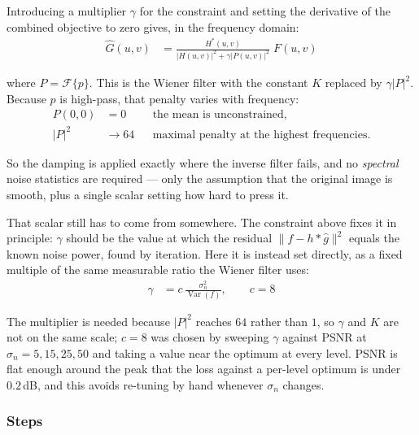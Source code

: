 \documentclass[10pt,twocolumn,letterpaper]{article}
\begin{document}
\noindent Introducing a multiplier $\gamma$ for the constraint and setting the derivative of
the combined objective to zero gives, in the frequency domain:
\begin{align}
  \hat{G}(u,v) &= \frac{H^{*}(u,v)}
                       {\left|H(u,v)\right|^{2} + \gamma\left|P(u,v)\right|^{2}}\;F(u,v)
\end{align}

\noindent where $P = \mathcal{F}\{p\}$. This is the Wiener filter with the constant $K$
replaced by $\gamma\left|P\right|^{2}$. Because $p$ is high-pass, that penalty varies with
frequency:
\begin{align}
  P(0,0) &= 0
    &&\text{the mean is unconstrained,} \\
  \left|P\right|^{2} &\to 64
    &&\text{maximal penalty at the highest frequencies.}
\end{align}

\noindent So the damping is applied exactly where the inverse filter fails, and no
\emph{spectral} noise statistics are required --- only the assumption that the original
image is smooth, plus a single scalar setting how hard to press it.

\noindent That scalar still has to come from somewhere. The constraint above fixes it in
principle: $\gamma$ should be the value at which the residual $\lVert f - h * \hat{g}
\rVert^{2}$ equals the known noise power, found by iteration. Here it is instead set
directly, as a fixed multiple of the same measurable ratio the Wiener filter uses:
\begin{align}
  \gamma &= c\,\frac{\sigma_{n}^{2}}{\operatorname{Var}(f)}, \qquad c = 8
\end{align}

\noindent The multiplier is needed because $\left|P\right|^{2}$ reaches $64$ rather than
$1$, so $\gamma$ and $K$ are not on the same scale; $c = 8$ was chosen by sweeping $\gamma$
against PSNR at $\sigma_{n} = 5, 15, 25, 50$ and taking a value near the optimum at every
level. PSNR is flat enough around the peak that the loss against a per-level optimum is
under $0.2$\,dB, and this avoids re-tuning by hand whenever $\sigma_{n}$ changes.

\subsubsection*{Steps}
\end{document}
